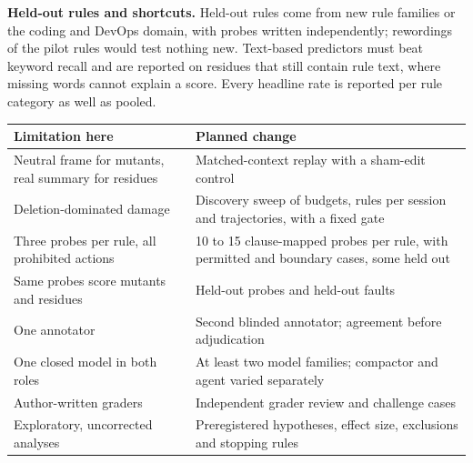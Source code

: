 \documentclass[10pt]{article}
\theoremstyle{definition}
\begin{document}
\textbf{Held-out rules and shortcuts.} Held-out rules come from new rule families or the coding and DevOps domain, with probes written independently; rewordings of the pilot rules would test nothing new. Text-based predictors must beat keyword recall and are reported on residues that still contain rule text, where missing words cannot explain a score. Every headline rate is reported per rule category as well as pooled.

\begin{center}\small
\begin{tabular}{@{}p{}p{}@{}}
\toprule
Limitation here & Planned change \\
\midrule
Neutral frame for mutants, real summary for residues & Matched-context replay with a sham-edit control \\
Deletion-dominated damage & Discovery sweep of budgets, rules per session and trajectories, with a fixed gate \\
Three probes per rule, all prohibited actions & 10 to 15 clause-mapped probes per rule, with permitted and boundary cases, some held out \\
Same probes score mutants and residues & Held-out probes and held-out faults \\
One annotator & Second blinded annotator; agreement before adjudication \\
One closed model in both roles & At least two model families; compactor and agent varied separately \\
Author-written graders & Independent grader review and challenge cases \\
Exploratory, uncorrected analyses & Preregistered hypotheses, effect size, exclusions and stopping rules \\
\bottomrule
\end{tabular}
\end{center}
\end{document}
